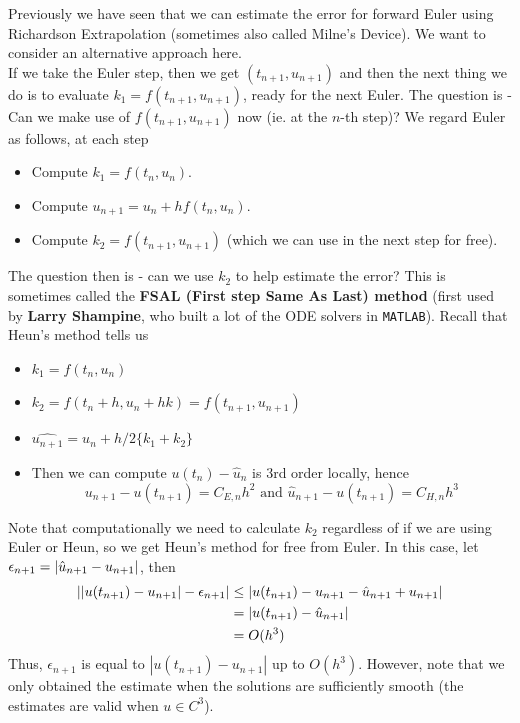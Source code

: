\documentclass{article}
\begin{document}
Previously we have seen that we can estimate the error for forward Euler using Richardson Extrapolation (sometimes also called Milne's Device). We want to consider an alternative approach here.\\

If we take the Euler step, then we get $(t_{n+1}, u_{n+1})$ and then the next thing we do is to evaluate $k_1 = f(t_{n+1}, u_{n+1})$, ready for the next Euler. The question is - Can we make use of $f(t_{n+1}, u_{n+1})$ now (ie. at the $n$-th step)? We regard Euler as follows, at each step
\begin{itemize}
    \item Compute $k_1 = f(t_n, u_n)$.
    \item Compute $u_{n+1} = u_n + h f(t_n, u_n)$.
    \item Compute $k_2 = f(t_{n+1}, u_{n+1})$ (which we can use in the next step for free).
\end{itemize}
The question then is - can we use $k_2$ to help estimate the error? This is sometimes called the \textbf{FSAL (First step Same As Last) method} (first used by \textbf{Larry Shampine}, who built a lot of the ODE solvers in \texttt{MATLAB}). Recall that Heun's method tells us
\begin{itemize}
    \item $k_1 = f(t_n, u_n)$
    \item $k_2 = f(t_n + h, u_n + hk) = f(t_{n+1}, u_{n+1})$
    \item $\hat{u_{n+1}} = u_n + h/2 \{k_1 + k_2\}$
    \item Then we can compute $u(t_n) - \hat{u}_n$ is 3rd order locally, hence
    \[u_{n+1} - u(t_{n+1}) = C_{E, n} h^2 \text{ and } \hat{u}_{n+1} - u(t_{n+1}) = C_{H, n} h^3\]
\end{itemize}

Note that computationally we need to calculate $k_2$ regardless of if we are using Euler or Heun, so we get Heun's method for free from Euler. In this case, let $\epsilon_{n+1} = |\Hat{u}_{n+1} - u_{n+1}|$, then
\begin{align*}
    ||u(t_{n+1}) - u_{n+1}| - \epsilon_{n+1}| &\leq |u(t_{n+1}) - u_{n+1} - \Hat{u}_{n+1} + u_{n+1}|\\
    &= |u(t_{n+1}) - \Hat{u}_{n+1}|\\
    &= O(h^3)
\end{align*}
Thus, $\epsilon_{n+1}$ is equal to $|u(t_{n+1}) - u_{n+1}|$ up to $O(h^3)$. However, note that we only obtained the estimate when the solutions are sufficiently smooth (the estimates are valid when $u \in C^3$).\\
\end{document}
